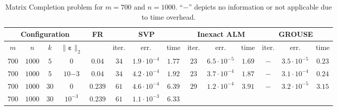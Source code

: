 \documentclass[twocolumn]{svjour3}
\newcommand{\vectornormbig}[1]{\big\|#1\big\|}
\newcommand{\noise}{\boldsymbol{\varepsilon}}
\newcommand{\rank}{k}
\begin{document}
\begin{table*} [!htp]
\caption{Matrix Completion problem for $m = 700$ and $n = 1000$. ``$-$'' depicts no information or not applicable due to time overhead.} {\label{table:3}}
\begin{center}
\begin{tabular}{|c|c|c|c|c|c|c|c|c|c|c|c|c|c}
\multicolumn{4}{c|}{Configuration} & FR & \multicolumn{3}{|c|}{SVP} & \multicolumn{3}{|c|}{Inexact ALM} & \multicolumn{3}{|c}{GROUSE} \\
\hline \hline
\multicolumn{1}{c}{$m$}  & \multicolumn{1}{c}{$n$} & \multicolumn{1}{c}{$\rank$} & \multicolumn{1}{c|}{$\vectornormbig{\noise}_2$} & & 
\multicolumn{1}{|c}{\rm{iter.}} & \multicolumn{1}{c}{\rm{err.}} & \multicolumn{1}{c|}{\rm{time}} &
\multicolumn{1}{|c}{\rm{iter.}} & \multicolumn{1}{c}{\rm{err.}} & \multicolumn{1}{c|}{\rm{time}} &
\multicolumn{1}{|c}{\rm{iter.}} & \multicolumn{1}{c}{\rm{err.}} & \multicolumn{1}{c}{\rm{time}} \\
\hline\hline
\multicolumn{1}{c}{$700$} & \multicolumn{1}{c}{$1000$} & \multicolumn{1}{c}{$5$} & \multicolumn{1}{c|}{$0$} & $ 0.04 $ & 
\multicolumn{1}{|c}{$34$} & \multicolumn{1}{c}{$1.9\cdot 10^{-4}$} & \multicolumn{1}{c|}{$1.77$} &
\multicolumn{1}{|c}{$23$} & \multicolumn{1}{c}{$6.5\cdot 10^{-5}$} & \multicolumn{1}{c|}{$1.69$} &
\multicolumn{1}{|c}{$-$} & \multicolumn{1}{c}{$3.5\cdot 10^{-5}$} & \multicolumn{1}{c}{$\mathbf{0.23}$} \\
\hline
\multicolumn{1}{c}{$700$} & \multicolumn{1}{c}{$1000$} & \multicolumn{1}{c}{$5$} & \multicolumn{1}{c|}{$10{-3}$} & $ 0.04 $ & 
\multicolumn{1}{|c}{$34$} & \multicolumn{1}{c}{$4.2\cdot 10^{-4}$} & \multicolumn{1}{c|}{$1.92$} &
\multicolumn{1}{|c}{$23$} & \multicolumn{1}{c}{$3.7\cdot 10^{-4}$} & \multicolumn{1}{c|}{$1.87$} &
\multicolumn{1}{|c}{$-$} & \multicolumn{1}{c}{$3.1\cdot 10^{-4}$} & \multicolumn{1}{c}{$\mathbf{0.24}$} \\
\hline
\multicolumn{1}{c}{$700$} & \multicolumn{1}{c}{$1000$} & \multicolumn{1}{c}{$30$} & \multicolumn{1}{c|}{$0$} & $0.239 $ & 
\multicolumn{1}{|c}{$61$} & \multicolumn{1}{c}{$4.6\cdot 10^{-4}$} & \multicolumn{1}{c|}{$6.39$} &
\multicolumn{1}{|c}{$29$} & \multicolumn{1}{c}{$1.2\cdot 10^{-4}$} & \multicolumn{1}{c|}{$3.91$} &
\multicolumn{1}{|c}{$-$} & \multicolumn{1}{c}{$3.2\cdot 10^{-5}$} & \multicolumn{1}{c}{$3.15$} \\
\hline
\multicolumn{1}{c}{$700$} & \multicolumn{1}{c}{$1000$} & \multicolumn{1}{c}{$30$} & \multicolumn{1}{c|}{$10^{-3}$} & $0.239 $ & 
\multicolumn{1}{|c}{$61$} & \multicolumn{1}{c}{$1.1\cdot 10^{-3}$} & \multicolumn{1}{c|}{$6.33$} &

\end{tabular}
\end{center}
\end{table*}
\end{document}
